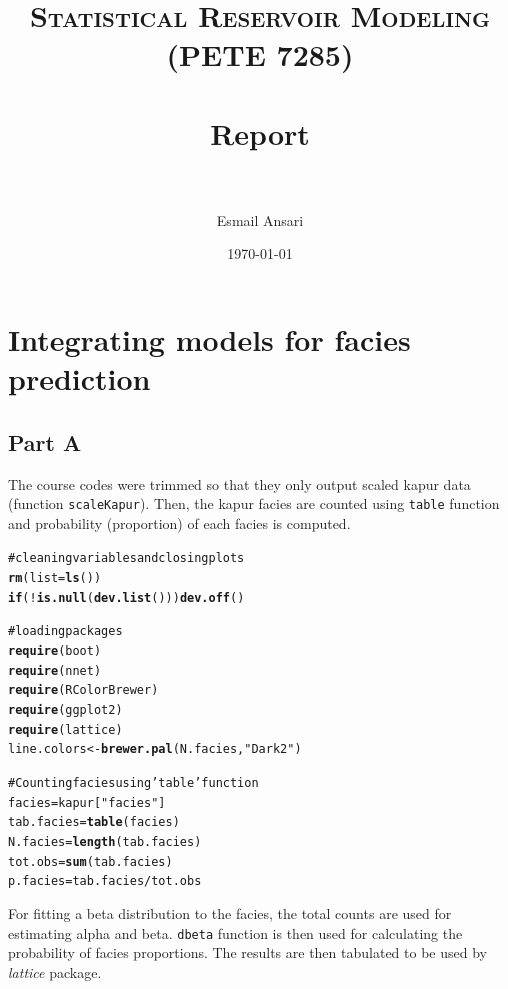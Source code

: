 \documentclass[paper=a4, fontsize=12pt]{scrartcl}\usepackage{graphicx, color}
\title{	
\normalfont \normalsize 
\textsc{Statistical Reservoir Modeling \\
(PETE 7285)} \\ [25pt] %
\horrule{0.5pt} \\[0.4cm] %
\huge  Report \\ %
\horrule{2pt} \\[0.5cm] %
}
\author{Esmail Ansari} %
\date{\small\today} %
\makeatletter
\newcommand{\hlfunctioncall}[1]{\textcolor[rgb]{0.501960784313725,0,0.329411764705882}{\textbf{#1}}}%
\newcommand{\hlstring}[1]{\textcolor[rgb]{0.6,0.6,1}{#1}}%
\newcommand{\hlcomment}[1]{\textcolor[rgb]{0.180392156862745,0.6,0.341176470588235}{#1}}%
\newenvironment{kframe}{%
 \def\at@end@of@kframe{}%
 \ifinner\ifhmode%
  \def\at@end@of@kframe{\end{minipage}}%
  \begin{minipage}{\columnwidth}%
 \fi\fi%
 \def\FrameCommand##1{\hskip\@totalleftmargin \hskip-\fboxsep
 \colorbox{shadecolor}{##1}\hskip-\fboxsep
     \hskip-\linewidth \hskip-\@totalleftmargin \hskip\columnwidth}%
 \MakeFramed {\advance\hsize-\width
   \@totalleftmargin\z@ \linewidth\hsize
   \@setminipage}}%
 {\par\unskip\endMakeFramed%
 \at@end@of@kframe}
\newenvironment{knitrout}{}{} %
\numberwithin{equation}{section} %
\numberwithin{figure}{section} %
\numberwithin{table}{section} %
\makeatother
\begin{document}
\maketitle %


\section{Integrating models for facies prediction}

\subsection{Part A}
The course codes were trimmed so that they only output scaled kapur data (function \texttt{scaleKapur}). Then, the kapur facies are counted using \texttt{table} function and probability (proportion) of each facies is computed. 

\begin{knitrout}
\color{fgcolor}\begin{kframe}
\begin{alltt}
\hlcomment{#cleaning variables and closing plots}
\hlfunctioncall{rm}(list=\hlfunctioncall{ls}())
\hlfunctioncall{if} (!\hlfunctioncall{is.null}(\hlfunctioncall{dev.list}())) \hlfunctioncall{dev.off}()

\hlcomment{#loading packages}
\hlfunctioncall{require}(boot)
\hlfunctioncall{require}(nnet)
\hlfunctioncall{require}(RColorBrewer)
\hlfunctioncall{require}(ggplot2)
\hlfunctioncall{require}(lattice)
line.colors <- \hlfunctioncall{brewer.pal}(N.facies,\hlstring{"Dark2"})

\hlcomment{#Counting facies using 'table' function}
facies     = kapur[\hlstring{"facies"}]
tab.facies = \hlfunctioncall{table}(facies)
N.facies   = \hlfunctioncall{length}(tab.facies)
tot.obs    = \hlfunctioncall{sum}(tab.facies)
p.facies   = tab.facies/tot.obs
\end{alltt}
\end{kframe}
\end{knitrout}


For fitting a beta distribution to the facies, the total counts are used for estimating alpha and beta. \texttt{dbeta} function is then used for calculating the probability of facies proportions. The results are then tabulated to be used by \textit{lattice} package. 
\end{document}
